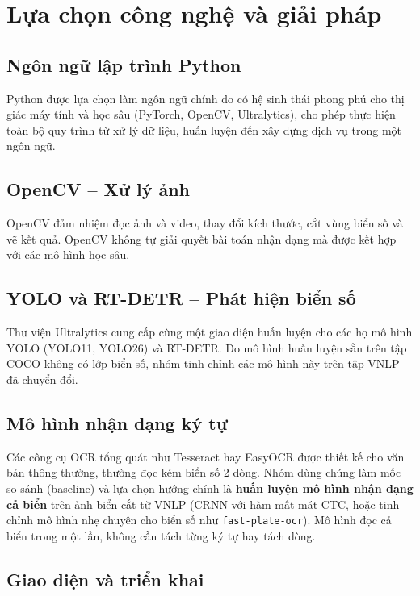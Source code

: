 \section{Lựa chọn công nghệ và giải pháp}

\subsection{Ngôn ngữ lập trình Python}

Python được lựa chọn làm ngôn ngữ chính do có hệ sinh thái phong phú cho thị giác máy tính và học sâu (PyTorch, OpenCV, Ultralytics), cho phép thực hiện toàn bộ quy trình từ xử lý dữ liệu, huấn luyện đến xây dựng dịch vụ trong một ngôn ngữ.

\subsection{OpenCV -- Xử lý ảnh}

OpenCV đảm nhiệm đọc ảnh và video, thay đổi kích thước, cắt vùng biển số và vẽ kết quả. OpenCV không tự giải quyết bài toán nhận dạng mà được kết hợp với các mô hình học sâu.

\subsection{YOLO và RT-DETR -- Phát hiện biển số}

Thư viện Ultralytics cung cấp cùng một giao diện huấn luyện cho các họ mô hình YOLO (YOLO11, YOLO26) và RT-DETR. Do mô hình huấn luyện sẵn trên tập COCO không có lớp biển số, nhóm tinh chỉnh các mô hình này trên tập VNLP đã chuyển đổi.

\subsection{Mô hình nhận dạng ký tự}

Các công cụ OCR tổng quát như Tesseract hay EasyOCR được thiết kế cho văn bản thông thường, thường đọc kém biển số 2 dòng. Nhóm dùng chúng làm mốc so sánh (baseline) và lựa chọn hướng chính là \textbf{huấn luyện mô hình nhận dạng cả biển} trên ảnh biển cắt từ VNLP (CRNN với hàm mất mát CTC, hoặc tinh chỉnh mô hình nhẹ chuyên cho biển số như \texttt{fast-plate-ocr}). Mô hình đọc cả biển trong một lần, không cần tách từng ký tự hay tách dòng.

\subsection{Giao diện và triển khai}

